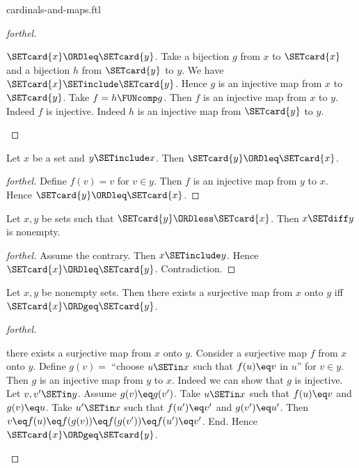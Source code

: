 \documentclass{stex}
\begin{document}
\begin{smodule}{cardinals-and-maps.ftl}
\begin{proof}[forthel]
  \begin{case}{$\SETcard{x} \ORDleq \SETcard{y}$.}
    Take a bijection $g$ from $x$ to $\SETcard{x}$ and a bijection $h$ from $\SETcard{y}$ to $y$.
    We have $\SETcard{x} \SETinclude \SETcard{y}$.
    Hence $g$ is an injective map from $x$ to $\SETcard{y}$.
    Take $f = h \FUNcomp g$.
    Then $f$ is an injective map from $x$ to $y$.
    Indeed $f$ is injective.
    Indeed $h$ is an injective map from $\SETcard{y}$ to $y$.
  \end{case}
\end{proof}

\begin{corollary}[forthel,id=SET_THEORY_06_4944303633727488]
  Let $x$ be a set and $y \SETinclude x$.
  Then $\SETcard{y} \ORDleq \SETcard{x}$.
\end{corollary}
\begin{proof}[forthel]
  Define $f(v) = v$ for $v \in y$.
  Then $f$ is an injective map from $y$ to $x$.
  Hence $\SETcard{y} \ORDleq \SETcard{x}$.
\end{proof}

\begin{corollary}[forthel,id=SET_THEORY_06_7746592696172544]
  Let $x, y$ be sets such that $\SETcard{y} \ORDless \SETcard{x}$.
  Then $x \SETdiff y$ is nonempty.
\end{corollary}
\begin{proof}[forthel]
  Assume the contrary.
  Then $x \SETinclude y$.
  Hence $\SETcard{x} \ORDleq \SETcard{y}$.
  Contradiction.
\end{proof}

\begin{proposition}[forthel,id=SET_THEORY_06_192336220913664]
  Let $x, y$ be nonempty sets.
  Then there exists a surjective map from $x$ onto $y$ iff $\SETcard{x} \ORDgeq \SETcard{y}$.
\end{proposition}
\begin{proof}[forthel]
  \begin{case}{there exists a surjective map from $x$ onto $y$.}
    Consider a surjective map $f$ from $x$ onto $y$.
    Define $g(v) =$ ``choose $u \SETin x$ such that $f(u) \eq v$ in $u$'' for $v \in y$.
    Then $g$ is an injective map from $y$ to $x$.
    Indeed we can show that $g$ is injective.
      Let $v, v' \SETin y$.
      Assume $g(v) \eq g(v')$.
      Take $u \SETin x$ such that $f(u) \eq v$ and $g(v) \eq u$.
      Take $u' \SETin x$ such that $f(u') \eq v'$ and $g(v') \eq u'$.
      Then $v
        \eq f(u)
        \eq f(g(v))
        \eq f(g(v'))
        \eq f(u')
        \eq v'$.
    End.
    Hence $\SETcard{x} \ORDgeq \SETcard{y}$.
  \end{case}


\end{proof}
\end{smodule}
\end{document}
